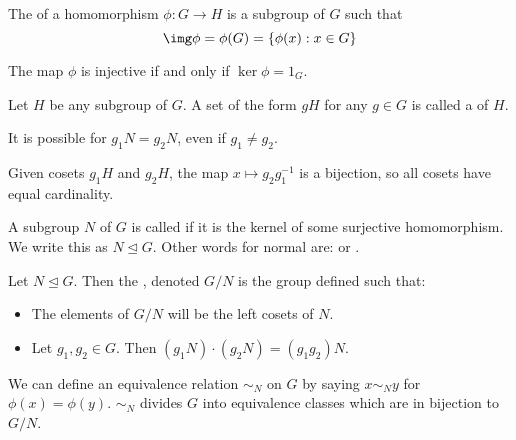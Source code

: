 \documentclass{article}
\begin{document}
\begin{defn}
  The  of a homomorphism $\phi : G \rightarrow H$ is a subgroup of $G$ such that
  $$\img \phi = \phi(G) = \{\phi(x) : x \in G \}$$
\end{defn}

\begin{prop}
  The map $\phi$ is injective if and only if $\ker \phi = {1_G}$. 
\end{prop}

\begin{defn}
  Let $H$ be any subgroup of $G$. A set of the form $gH$ for any $g \in G$ is called a
   of $H$. 
\end{defn}

\begin{remark}
  It is possible for $g_1N = g_2N$, even if $g_1 \neq g_2$. 
\end{remark}

\begin{remark}
  Given cosets $g_1H$ and $g_2H$, the map $x \mapsto g_2g_1^{-1}$ is a bijection, so
  all cosets have equal cardinality. 
\end{remark}

\begin{defn}
  A subgroup $N$ of $G$ is called  if it is the kernel of some surjective
  homomorphism. We write this as $N \trianglelefteq G$. Other words for normal are:
   or . 
\end{defn}

\begin{defn}
  Let $N \trianglelefteq G$. Then the , denoted $G/N$ is
  the group defined such that:
  \begin{itemize}
  \item The elements of $G/N$ will be the left cosets of $N$.
  \item Let $g_1, g_2 \in G$. Then $(g_1N) \cdot (g_2N) = (g_1g_2)N$. 
  \end{itemize}
\end{defn}

\begin{remark}
  We can define an equivalence relation $\sim_N$ on $G$ by saying $x \sim_N y$ for
  $\phi(x) = \phi(y)$. $\sim_N$ divides $G$ into equivalence classes which are
  in bijection to $G/N$. 
\end{remark}
\end{document}
